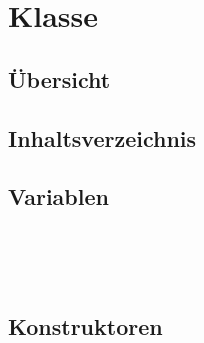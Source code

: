 
\section[EntryInfo]{Klasse }\label{ontologyFramework.OFErrorManagement.OFGUI.EntryInfo-class}
\subsection{Übersicht}

\subsection{Inhaltsverzeichnis}
\subsection{Variablen}
\begin{description}
\item[{\label{ontologyFramework.OFErrorManagement.OFGUI.EntryInfo.name}}]
~ 
\item[{\label{ontologyFramework.OFErrorManagement.OFGUI.EntryInfo.icon}}]
~ 
\end{description}
\subsection{Konstruktoren}
\begin{description}
\item[{\label{ontologyFramework.OFErrorManagement.OFGUI.EntryInfo(java.lang.String,int)}}]
~ 
\end{description}
